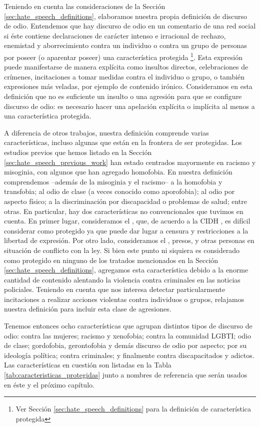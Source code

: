 Teniendo en cuenta las consideraciones de la Sección \ref{sec:hate_speech_definitions}, elaboramos nuestra propia definición de discurso de odio. Entendemos que hay discurso de odio en un comentario de una red social si éste contiene declaraciones de carácter intenso e irracional de rechazo, enemistad y aborrecimiento contra un individuo o contra un grupo de personas por poseer (o aparentar poseer) una característica protegida \footnote{Ver Sección \ref{sec:hate_speech_definitions} para la definición de característica protegida}. Esta expresión puede manifestarse de manera explícita como insultos directos, celebraciones de crímenes, incitaciones a tomar medidas contra el individuo o grupo, o también expresiones más veladas, por ejemplo de contenido irónico. Consideramos en esta definición que no es suficiente un insulto o una agresión para que se configure discurso de odio: es necesario hacer una apelación explícita o implícita al menos a una característica protegida.

A diferencia de otros trabajos, nuestra definición comprende varias características, incluso algunas que están en la frontera de ser protegidas. Los estudios previos que hemos listado en la Sección \ref{sec:hate_speech_previous_work} han estado centrados mayormente en racismo y misoginia, con algunos que han agregado homofobia. En nuestra definición comprendemos --además de la misoginia y el racismo-- a la homofobia y transfobia; al odio de clase (a veces conocido como aporofobia); al odio por aspecto físico; a la discriminación por discapacidad o problemas de salud; entre otras. En particular, hay dos características no convencionales que tuvimos en cuenta. En primer lugar, consideramos el , que, de acuerdo a la CIDH \cite{CIDH2015}, es difícil considerar como protegido ya que puede dar lugar a censura y restricciones a la libertad de expresión. Por otro lado, consideramos el , presos, y otras personas en situación de conflicto con la ley. Si bien este punto ni siquiera es considerado como protegido en ninguno de los tratados mencionados en la Sección \ref{sec:hate_speech_definitions}, agregamos esta característica debido a la enorme cantidad de contenido alentando la violencia contra criminales en las noticias policiales. Teniendo en cuenta que nos interesa detectar particularmente incitaciones a realizar acciones violentas contra individuos o grupos, relajamos nuestra definición para incluir esta clase de agresiones.

Tenemos entonces ocho características que agrupan distintos tipos de discurso de odio: contra las mujeres; racismo y xenofobia; contra la comunidad LGBTI; odio de clase; gordofobia, gerontofobia y demás discurso de odio por aspecto; por su ideología política; contra criminales; y finalmente contra discapacitados y adictos. Las características en cuestión son listadas en la Tabla \ref{tab:caracteristicas_protegidas} junto a nombres de referencia que serán usados en éste y el próximo capítulo.

